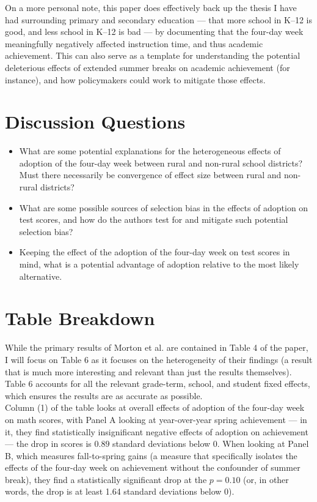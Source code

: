 \documentclass[8pt]{extarticle}
\begin{document}
  On a more personal note, this paper does effectively back up the thesis I have had surrounding primary and secondary education --- that more school in K--12 is good, and less school in K--12 is bad --- by documenting that the four-day week meaningfully negatively affected instruction time, and thus academic achievement. This can also serve as a template for understanding the potential deleterious effects of extended summer breaks on academic achievement (for instance), and how policymakers could work to mitigate those effects.
  \section{Discussion Questions}%
  \begin{itemize}
    \item What are some potential explanations for the heterogeneous effects of adoption of the four-day week between rural and non-rural school districts? Must there necessarily be convergence of effect size between rural and non-rural districts?
    \item What are some possible sources of selection bias in the effects of adoption on test scores, and how do the authors test for and mitigate such potential selection bias?
    \item Keeping the effect of the adoption of the four-day week on test scores in mind, what is a potential advantage of adoption relative to the most likely alternative.
  \end{itemize}
  \section{Table Breakdown}%
  While the primary results of Morton et al. are contained in Table 4 of the paper, I will focus on Table 6 as it focuses on the heterogeneity of their findings (a result that is much more interesting and relevant than just the results themselves). Table 6 accounts for all the relevant grade-term, school, and student fixed effects, which ensures the results are as accurate as possible.\\

  Column (1) of the table looks at overall effects of adoption of the four-day week on math scores, with Panel A looking at year-over-year spring achievement --- in it, they find statistically insignificant negative effects of adoption on achievement --- the drop in scores is $0.89$ standard deviations below $0$. When looking at Panel B, which measures fall-to-spring gains (a measure that specifically isolates the effects of the four-day week on achievement without the confounder of summer break), they find a statistically significant drop at the $p = 0.10$ (or, in other words, the drop is at least 1.64 standard deviations below $0$).\\
\end{document}

